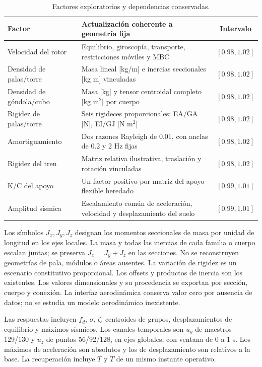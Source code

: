 \begin{table}[htbp]
\centering\small
\caption{Factores exploratorios y dependencias conservadas.}\label{tab:param}
\begin{tabular}{>{\raggedright\arraybackslash}p{3.2cm}>{\raggedright\arraybackslash}p{8.4cm}c}
\toprule
Factor & Actualización coherente a geometría fija & Intervalo\\
\midrule
Velocidad del rotor & Equilibrio, giroscopía, transporte, restricciones móviles y MBC & $[0.98,1.02]$\\
Densidad de palas/torre & Masa lineal [kg/m] e inercias seccionales [kg m] vinculadas & $[0.98,1.02]$\\
Densidad de góndola/cubo & Masa [kg] y tensor centroidal completo [kg m$^2$] por cuerpo & $[0.98,1.02]$\\
Rigidez de palas/torre & Seis rigideces proporcionales: EA/GA [N], EI/GJ [N m$^2$] & $[0.98,1.02]$\\
Amortiguamiento & Dos razones Rayleigh de 0.01, con anclas de 0.2 y 2 Hz fijas & $[0.98,1.02]$\\
Rigidez del tren & Matriz relativa ilustrativa, traslación y rotación vinculadas & $[0.98,1.02]$\\
K/C del apoyo & Un factor positivo por matriz del apoyo flexible heredado & $[0.99,1.01]$\\
Amplitud sísmica & Escalamiento común de aceleración, velocidad y desplazamiento del suelo & $[0.99,1.01]$\\
\bottomrule
\end{tabular}
\end{table}

Los símbolos $J_x,J_y,J_z$ designan los momentos seccionales de masa por unidad de longitud en los ejes locales. La masa y todas las inercias de cada familia o cuerpo escalan juntas; se preserva $J_x=J_y+J_z$ en las secciones. No se reconstruyen geometrías de pala, módulos o áreas ausentes. La variación de rigidez es un escenario constitutivo proporcional. Los offsets y productos de inercia son los existentes. Los valores dimensionales y su procedencia se exportan por sección, cuerpo y conexión. La interfaz aerodinámica conserva valor cero por ausencia de datos; no se estudia un modelo aerodinámico inexistente.

Las respuestas incluyen $f_d$, $\sigma$, $\zeta$, centroides de grupos, desplazamientos de equilibrio y máximos sísmicos. Los canales temporales son $u_y$ de maestros 129/130 y $u_z$ de puntas 56/92/128, en ejes globales, con ventana de $0$ a $1$ s. Los máximos de aceleración son absolutos y los de desplazamiento son relativos a la base. La recuperación incluye $\dot T$ y $\ddot T$ de un mismo instante operativo.

